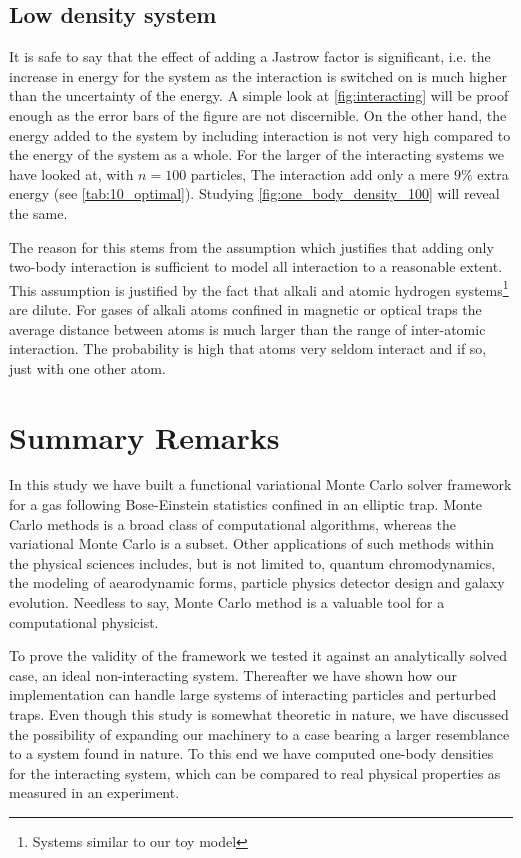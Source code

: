 \documentclass[
    a4paper, aps, twocolumn, floatfix, superscriptaddress,
    nofootinbib]{revtex4-1}
\newcommand{\1}{\mathds{1}}
\begin{document}
	\subsection{Low density system}
		It is safe to say that the effect of adding a Jastrow factor is significant, 
		i.e. the increase in
        	energy for the system as the interaction is switched on is much higher
        	than the uncertainty of the energy. A simple look at \autoref{fig:interacting}
        	will be proof enough as the error bars of the figure are not discernible. 
        On the other hand, the energy added to the system by including interaction
        is not very high compared to the energy of the system as a whole. For the 
        larger of the interacting systems we have looked at, with $n=100$ particles,
        The interaction add only a mere $9\%$ extra energy (see \autoref{tab:10_optimal}).
        Studying \autoref{fig:one_body_density_100} will reveal the same.
        
        The reason for this stems from the assumption which justifies that
        adding only two-body interaction is sufficient to model all interaction to a
        reasonable extent. This assumption is justified by the fact that alkali and
        atomic hydrogen systems\footnote{Systems similar to our toy model}
        are dilute. For gases of alkali atoms confined in magnetic or optical traps
        the average distance between atoms is much larger than the range of
        inter-atomic interaction. The probability is high that atoms very seldom
        interact and if so, just with one other atom. 

\section{Summary Remarks}

	In this study we have built a functional variational Monte Carlo solver framework for 
	a gas following Bose-Einstein statistics confined in an elliptic trap. Monte Carlo 
	methods is a broad class of computational algorithms, whereas the variational
	Monte Carlo is a subset. Other applications of such methods within the physical
	sciences includes, but is not limited to, quantum chromodynamics, the modeling of
	aearodynamic forms, particle physics detector design and galaxy evolution. 
	Needless to say, Monte Carlo method is a valuable tool for a computational physicist.
	
	To prove the 
	validity of the framework we tested it against an analytically solved case, an ideal
	non-interacting system. Thereafter we have shown how our implementation can
	handle large systems of interacting particles and perturbed traps. Even though
	this study is somewhat theoretic in nature, we have discussed the possibility of
	expanding our machinery to a case bearing a larger resemblance to a system
	found in nature. To this end we have computed one-body densities for the 
	interacting system, which can be compared to real physical properties as
	measured in an experiment. 
\end{document}

